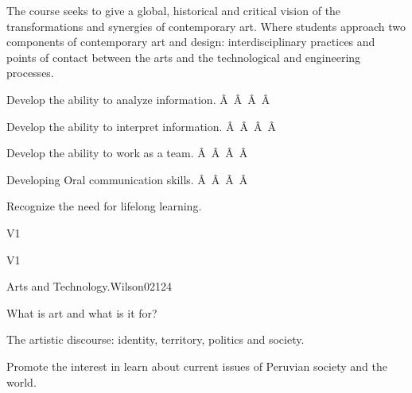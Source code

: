 \begin{syllabus}


\begin{justification}
The course seeks to give a global, historical and critical vision of the transformations and synergies of contemporary art. Where students approach two components of contemporary art and design: interdisciplinary practices and points of contact between the arts and the technological and engineering processes.
\end{justification}

\begin{goals}
    \item Develop the ability to analyze information.
Â Â Â Â \item Develop the ability to interpret information.
Â Â Â Â \item Develop the ability to work as a team.
Â Â Â Â \item Developing Oral communication skills.
Â Â Â Â \item Recognize the need for lifelong learning.   
\end{goals}

\begin{outcomes}{V1}
    \item {} %
    \item {} %
    \item {} %
    \item {} %
    \item {} %
\end{outcomes}

\begin{competences}{V1}
    \item {}
    \item {}
    \item {}
    \item {}
\end{competences}

\begin{unit}{Arts and Technology.}{}{Wilson02}{12}{4}
   \begin{topics}
      \item What is art and what is it for?
      \item The artistic discourse: identity, territory, politics and society.
   \end{topics}
   \begin{learningoutcomes}
      \item Promote the  interest in learn about current issues of Peruvian society and the world.
   \end{learningoutcomes}
\end{unit}


\end{syllabus}
